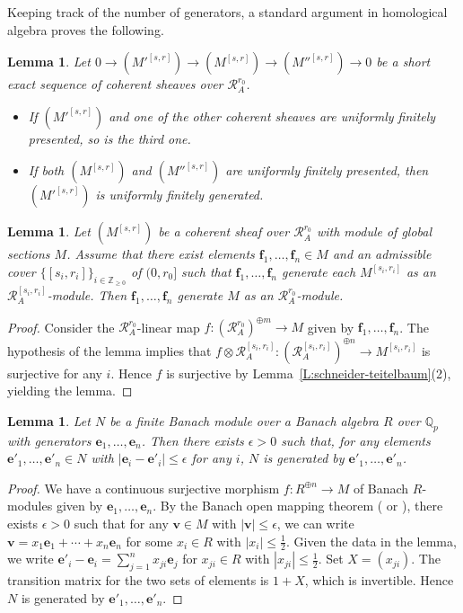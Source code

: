 \documentclass[12pt]{article}
\newtheorem{lemma}[theorem]{Lemma}
\theoremstyle{definition}
\numberwithin{equation}{theorem}
\newcommand{\calR}{\mathcal{R}}
\newcommand{\QQ}{\mathbb{Q}}
\newcommand{\ZZ}{\mathbb{Z}}
\newcommand{\bbe}{\mathbf{e}}
\newcommand{\bbf}{\mathbf{f}}
\newcommand{\bbv}{\mathbf{v}}
\def\Qp{\QQ_p}
\begin{document}
Keeping track of the number of generators, a standard argument in homological algebra proves the following.

\begin{lemma}
\label{L:always-finitely presented}
Let $0 \to (M'^{[s,r]}) \to (M^{[s,r]}) \to (M''^{[s,r]}) \to 0$ be a short exact sequence  of coherent sheaves over $\calR_A^{r_0}$.
\begin{itemize}
\item If $(M'^{[s,r]})$ and one of the other coherent sheaves are uniformly finitely presented, so is the third one.
\item If both $(M^{[s,r]})$ and $(M''^{[s,r]})$ are uniformly finitely presented, then $(M'^{[s,r]})$ is uniformly finitely generated.
\end{itemize}
\end{lemma}


\begin{lemma}
\label{L:finite-generation-local}
Let $(M^{[s,r]})$ be a coherent sheaf over $\calR_A^{r_0}$ with module of global sections $M$.  Assume that there exist elements $\bbf_1, \dots, \bbf_n \in M$ and an admissible cover $\{[s_i, r_i]\}_{i \in \ZZ_{\geq 0}}$ of $(0, r_0]$ such that $\bbf_1, \dots, \bbf_n$ generate each $M^{[s_i, r_i]}$ as an $\calR_A^{[s_i,r_i]}$-module.  Then $\bbf_1, \dots, \bbf_n$ generate $M$ as an $\calR_A^{r_0}$-module.
\end{lemma}
\begin{proof}
Consider the $\calR_A^{r_0}$-linear map $f: (\calR_A^{r_0})^{\oplus m} \to M$ given by $\bbf_1, \dots, \bbf_n$.  The hypothesis of the lemma implies that
$
f \otimes \calR_A^{[s_i,r_i]}: (\calR_A^{[s_i,r_i]})^{\oplus n} \to M^{[s_i,r_i]}
$
is surjective for any $i$.  Hence $f$ is surjective by Lemma~\ref{L:schneider-teitelbaum}(2), yielding the lemma.
\end{proof}

\begin{lemma}
\label{L:perturbation-of-generators}
Let $N$ be a finite Banach module over a  Banach algebra $R$ over $\Qp$ with generators $\bbe_1, \dots, \bbe_n$.  Then there exists $\epsilon >0$ such that, for any elements $\bbe'_1, \dots, \bbe'_n \in N$ with $|\bbe_i - \bbe'_i|\leq \epsilon$ for any $i$, $N$ is generated by $\bbe'_1, \dots, \bbe'_n$.
\end{lemma}
\begin{proof}
We have a continuous surjective morphism $f: R^{\oplus n} \to M$ of Banach $R$-modules given by $\bbe_1, \dots, \bbe_n$.  By the Banach open mapping theorem (\cite[\S I.3.3,~Th\'eor\`eme 1]{bourbaki} or \cite[Proposition~8.6]{schneider}), there exists $\epsilon>0$ such that for any $\bbv \in M$ with $|\bbv|\leq \epsilon$, we can write $\bbv = x_1 \bbe_1+\cdots + x_n \bbe_n$ for some $x_i \in R$ with $|x_i|\leq \frac 12$.  Given the data in the lemma, we write $\bbe'_i-\bbe_i = \sum_{j=1}^n x_{ji}\bbe_j$ for $x_{ji} \in R$ with $|x_{ji}|\leq \frac 12$.  Set $X = (x_{ji})$.  The transition matrix for the two sets of elements is $1+X$, which is invertible.  Hence $N$ is generated by $\bbe'_1, \dots, \bbe'_n$.
\end{proof}
\end{document}
